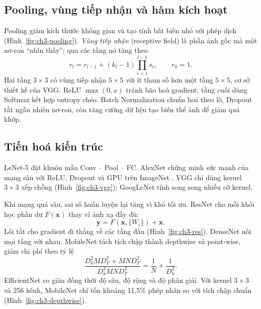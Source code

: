 \subsection{Pooling, vùng tiếp nhận và hàm kích hoạt}
Pooling giảm kích thước không gian và tạo tính bất biến nhỏ với phép dịch (Hình~\ref{fig:ch3-pooling}). \emph{Vùng tiếp nhận} (receptive field) là phần ảnh gốc mà một nơ-ron ``nhìn thấy''; qua các tầng nó tăng theo
\begin{equation}
  r_l=r_{l-1}+(k_l-1)\prod_{i=1}^{l-1}s_i,\qquad r_0=1.
\end{equation}
Hai tầng $3\times3$ có vùng tiếp nhận $5\times5$ với ít tham số hơn một tầng $5\times5$, cơ sở thiết kế của VGG. ReLU $\max(0,x)$ \cite{ch3:nair2010} tránh bão hoà gradient; tầng cuối dùng Softmax kết hợp entropy chéo.
Batch Normalization \cite{ch2:ioffe2015} chuẩn hoá theo lô, Dropout \cite{ch2:srivastava2014} tắt ngẫu nhiên nơ-ron, còn tăng cường dữ liệu \cite{ch3:shorten2019} tạo biến thể ảnh để giảm quá khớp.


\subsection{Tiến hoá kiến trúc}
LeNet-5 \cite{ch1:lecun1998} đặt khuôn mẫu Conv -- Pool -- FC. AlexNet \cite{ch1:krizhevsky2012} chứng minh sức mạnh của mạng sâu với ReLU, Dropout và GPU trên ImageNet \cite{ch3:russakovsky2015}. VGG \cite{ch3:simonyan2015} chỉ dùng kernel $3\times3$
xếp chồng (Hình~\ref{fig:ch3-vgg}); GoogLeNet \cite{ch3:szegedy2015} tính song song nhiều cỡ kernel.


Khi mạng quá sâu, sai số huấn luyện lại tăng vì khó tối ưu. ResNet \cite{ch3:he2016} cho mỗi khối học phần dư $F(\mathbf{x})$ thay vì ánh xạ đầy đủ:
\begin{equation}
  \mathbf{y}=F(\mathbf{x},\{W_i\})+\mathbf{x}.
\end{equation}
Lối tắt cho gradient đi thẳng về các tầng đầu (Hình~\ref{fig:ch3-res}). DenseNet \cite{ch3:huang2017} nối mọi tầng với nhau. MobileNet \cite{ch3:howard2017,ch3:sandler2018} tách tích chập thành depthwise và point-wise, giảm chi phí theo tỷ lệ
\begin{equation}
  \frac{D_k^2MD_F^2+MND_F^2}{D_k^2MND_F^2}=\frac1N+\frac1{D_k^2}.
\end{equation}
EfficientNet \cite{ch3:tan2019} co giãn đồng thời độ sâu, độ rộng và độ phân giải. Với kernel $3\times3$ và 256 kênh, MobileNet chỉ tốn khoảng 11,5\% phép nhân so với tích chập chuẩn (Hình~\ref{fig:ch3-depthwise}).

